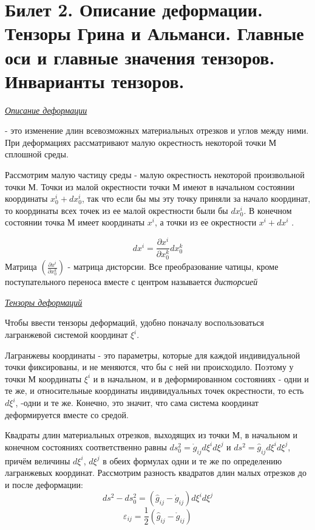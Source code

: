 \newpage
\section{Билет 2. Описание деформации. Тензоры Грина и Альманси. Главные оси и главные значения тензоров. Инварианты тензоров.}

\begin{center}
	\textit{\underline{Описание деформации}}
\end{center}

 - это изменение длин всевозможных материальных отрезков и углов между ними. При деформациях рассматривают малую окрестность некоторой точки М сплошной среды. 

Рассмотрим малую частицу среды - малую окрестность некоторой произвольной точки М. Точки из малой окрестности точки М имеют в начальном состоянии координаты $x_0^i+dx_0^i$, так что если бы мы эту точку приняли за начало координат, то координаты всех точек из ее малой окрестности были бы $dx_0^i$. В конечном состоянии точка М имеет координаты $x^i$, а точки из ее окрестности $x^i+dx^i$ .

$$dx^i=\frac{\partial x^i}{\partial x_0^k}dx_0^k$$
Матрица $\left( \frac {\partial x^i}{\partial x_0^k}\right)$ - матрица дисторсии. Все преобразование чатицы, кроме поступательного переноса вместе с центром называется \textit{дисторсией}

\begin{center}
	\textit{\underline{Тензоры деформаций}}
\end{center}
Чтобы ввести тензоры деформаций, удобно поначалу воспользоваться лагранжевой системой координат $\xi^i$.

Лагранжевы координаты - это параметры, которые для каждой индивидуальной точки фиксированы, и не меняются, что бы с ней ни происходило. Поэтому у точки М координаты $\xi^i$ и в начальном, и в деформированном состояниях - одни и те же, и относительные координаты индивидуальных точек окрестности, то есть $d\xi^i$, -одни и те же. Конечно, это значит, что сама система координат деформируется вместе со средой. 

Квадраты длин материальных отрезков, выходящих из точки М, в начальном и конечном состояниях соответственно равны $ds_0^2 = \mathring{g}_{ij}d\xi^id\xi^j$ и $ds^2 = \hat{g}_{ij}d\xi^id\xi^j$, причём величины $d\xi^i$, $d\xi^j$ в обеих формулах одни и те же по определению лагранжевых координат. Рассмотрим разность квадратов длин малых отрезков до и после деформации: $$ds^2 - ds_0^2 = (\hat{g}_{ij} - \mathring{g}_{ij})d\xi^id\xi^j$$
$$\varepsilon_{ij} = \frac{1}{2}(\hat{g}_{ij} - \mathring{g}_{ij})$$

